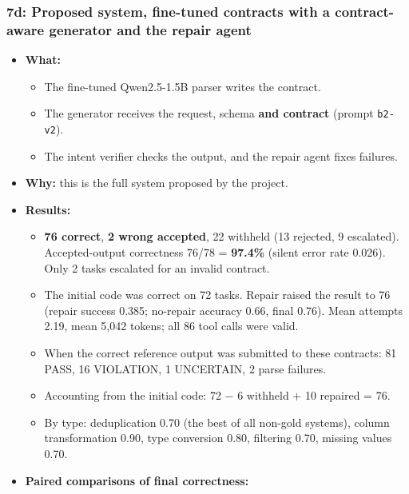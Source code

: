 \documentclass[11pt]{article}
\providecommand{\tightlist}{\setlength{\itemsep}{0pt}\setlength{\parskip}{0pt}}
\begin{document}
\subsubsection{7d: Proposed system, fine-tuned contracts with a
contract-aware generator and the repair agent}

\begin{itemize}
\tightlist
\item
  \textbf{What:}

  \begin{itemize}
  \tightlist
  \item
    The fine-tuned Qwen2.5-1.5B parser writes the contract.
  \item
    The generator receives the request, schema \textbf{and contract}
    (prompt \texttt{b2-v2}).
  \item
    The intent verifier checks the output, and the repair agent fixes
    failures.
  \end{itemize}
\item
  \textbf{Why:} this is the full system proposed by the project.
\item
  \textbf{Results:}

  \begin{itemize}
  \tightlist
  \item
    \textbf{76 correct}, \textbf{2 wrong accepted}, 22 withheld (13
    rejected, 9 escalated). Accepted-output correctness 76/78 =
    \textbf{97.4\%} (silent error rate 0.026). Only 2 tasks escalated
    for an invalid contract.
  \item
    The initial code was correct on 72 tasks. Repair raised the result
    to 76 (repair success 0.385; no-repair accuracy 0.66, final 0.76).
    Mean attempts 2.19, mean 5,042 tokens; all 86 tool calls were valid.
  \item
    When the correct reference output was submitted to these contracts:
    81 PASS, 16 VIOLATION, 1 UNCERTAIN, 2 parse failures.
  \item
    Accounting from the initial code: 72 − 6 withheld + 10 repaired =
    76.
  \item
    By type: deduplication 0.70 (the best of all non-gold systems),
    column transformation 0.90, type conversion 0.80, filtering 0.70,
    missing values 0.70.
  \end{itemize}
\item
  \textbf{Paired comparisons of final correctness:}
\end{itemize}
\end{document}
